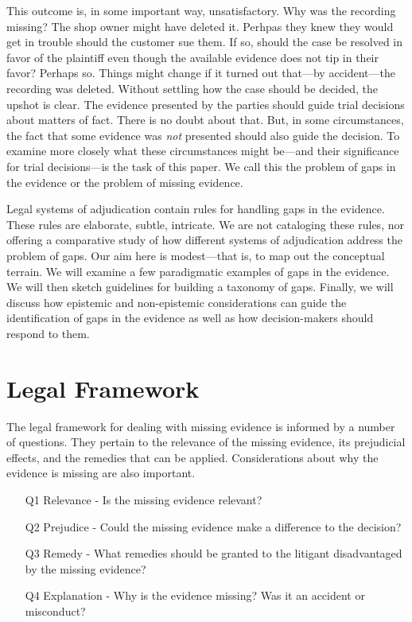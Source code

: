 \documentclass[
  10pt,
  dvipsnames,enabledeprecatedfontcommands]{scrartcl}
\begin{document}
This outcome is, in some important way, unsatisfactory. Why was the
recording missing? The shop owner might have deleted it. Perhpas they
knew they would get in trouble should the customer sue them. If so,
should the case be resolved in favor of the plaintiff even though the
available evidence does not tip in their favor? Perhaps so. Things might
change if it turned out that---by accident---the recording was deleted.
Without settling how the case should be decided, the upshot is clear.
The evidence presented by the parties should guide trial decisions about
matters of fact. There is no doubt about that. But, in some
circumstances, the fact that some evidence was \textit{not} presented
should also guide the decision. To examine more closely what these
circumstances might be---and their significance for trial decisions---is
the task of this paper. We call this the problem of gaps in the evidence
or the problem of missing evidence.

Legal systems of adjudication contain rules for handling gaps in the
evidence. These rules are elaborate, subtle, intricate. We are not
cataloging these rules, nor offering a comparative study of how
different systems of adjudication address the problem of gaps. Our aim
here is modest---that is, to map out the conceptual terrain. We will
examine a few paradigmatic examples of gaps in the evidence. We will
then sketch guidelines for building a taxonomy of gaps. Finally, we will
discuss how epistemic and non-epistemic considerations can guide the
identification of gaps in the evidence as well as how decision-makers
should respond to them.

\hypertarget{legal-framework}{%
\section{Legal Framework}\label{legal-framework}}

The legal framework for dealing with missing evidence is informed by a
number of questions. They pertain to the relevance of the missing
evidence, its prejudicial effects, and the remedies that can be applied.
Considerations about why the evidence is missing are also important.

\begin{itemize}
\item[Q1] Relevance - Is the missing evidence relevant?
\item[Q2] Prejudice - Could the missing evidence make a difference to the decision?
\item[Q3] Remedy - What remedies should be granted to the litigant disadvantaged 
by the missing evidence?
\item[Q4] Explanation - Why is the evidence missing? Was it an accident or  misconduct?
\end{itemize}
\end{document}
